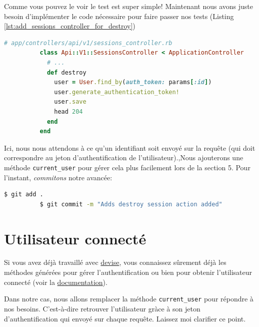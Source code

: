 \documentclass[]{report}
\begin{document}
        Comme vous pouvez le voir le test est super simple! Maintenant nous avons juste besoin d'implémenter le code nécessaire pour faire passer nos tests (Listing \ref{lst:add_sessions_controller_for_destroy})

        \begin{scriptsize}
          \begin{lstlisting}[language=ruby, caption={Création de la méthode de destruction des jetons d'authentification}, label={lst:add_sessions_controller_for_destroy}]
          # app/controllers/api/v1/sessions_controller.rb
          class Api::V1::SessionsController < ApplicationController
            # ...
            def destroy
              user = User.find_by(auth_token: params[:id])
              user.generate_authentication_token!
              user.save
              head 204
            end
          end
          \end{lstlisting}
        \end{scriptsize}

        Ici, nous nous attendons à ce qu'un identifiant soit envoyé sur la requête (qui doit correspondre au jeton d'authentification de l'utilisateur).,Nous ajouterons une méthode \verb|current_user| pour gérer cela plus facilement lors de la section 5. Pour l'instant, \textit{commitons} notre avancée:

        \begin{scriptsize}
          \begin{lstlisting}[language=bash]
          $ git add .
          $ git commit -m "Adds destroy session action added"
          \end{lstlisting}
        \end{scriptsize}

  \section{Utilisateur connecté}

    Si vous avez déjà travaillé avec \href{https://github.com/plataformatec/devise}{devise}, vous connaissez sûrement déjà les méthodes générées pour gérer l'authentification ou bien pour obtenir l'utilisateur connecté (voir la \href{https://github.com/plataformatec/devise#getting-started}{documentation}).

    Dans notre cas, nous allons remplacer la méthode \verb|current_user| pour répondre à nos besoins. C'est-à-dire retrouver l'utilisateur gràce à son  jeton d'authentification qui envoyé sur chaque requête. Laissez moi clarifier ce point.
\end{document}
